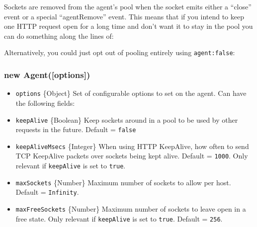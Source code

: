 Sockets are removed from the agent's pool when the socket emits either a
``close'' event or a special ``agentRemove'' event. This means that if
you intend to keep one HTTP request open for a long time and don't want
it to stay in the pool you can do something along the lines of:

\begin{Shaded}
\begin{Highlighting}[]
\NormalTok{(}\NormalTok{, } 
  \NormalTok{(}\NormalTok{);}
\NormalTok{\});}
\end{Highlighting}
\end{Shaded}

Alternatively, you could just opt out of pooling entirely using
\texttt{agent:false}:

\begin{Shaded}
\begin{Highlighting}[]
\NormalTok{(\{}
  \NormalTok{: }\NormalTok{,}
  \NormalTok{: }\NormalTok{,}
  \NormalTok{: }\NormalTok{,}
  \NormalTok{: }  
\NormalTok{\}, } 
\NormalTok{\})}
\end{Highlighting}
\end{Shaded}

\subsubsection{new Agent({[}options{]})}\label{new-agentoptions}

\begin{itemize}
\itemsep1pt\parskip0pt
\item
  \texttt{options} \{Object\} Set of configurable options to set on the
  agent. Can have the following fields:
\item
  \texttt{keepAlive} \{Boolean\} Keep sockets around in a pool to be
  used by other requests in the future. Default = \texttt{false}
\item
  \texttt{keepAliveMsecs} \{Integer\} When using HTTP KeepAlive, how
  often to send TCP KeepAlive packets over sockets being kept alive.
  Default = \texttt{1000}. Only relevant if \texttt{keepAlive} is set to
  \texttt{true}.
\item
  \texttt{maxSockets} \{Number\} Maximum number of sockets to allow per
  host. Default = \texttt{Infinity}.
\item
  \texttt{maxFreeSockets} \{Number\} Maximum number of sockets to leave
  open in a free state. Only relevant if \texttt{keepAlive} is set to
  \texttt{true}. Default = \texttt{256}.
\end{itemize}

